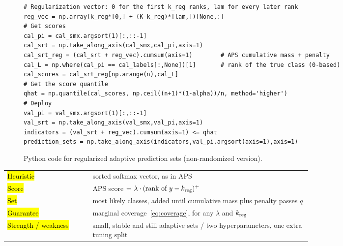 \documentclass[11pt]{article}
\theoremstyle{definition}
\newcommand{\qhat}{\hat{q}}
\newcommand{\kreg}{k_{\rm reg}}
\begin{document}
\begin{figure}[H]
\begin{snugshade}
\begin{Verbatim}
# Regularization vector: 0 for the first k_reg ranks, lam for every later rank
reg_vec = np.array(k_reg*[0,] + (K-k_reg)*[lam,])[None,:]
# Get scores
cal_pi = cal_smx.argsort(1)[:,::-1]
cal_srt = np.take_along_axis(cal_smx,cal_pi,axis=1)
cal_srt_reg = (cal_srt + reg_vec).cumsum(axis=1)        # APS cumulative mass + penalty
cal_L = np.where(cal_pi == cal_labels[:,None])[1]       # rank of the true class (0-based)
cal_scores = cal_srt_reg[np.arange(n),cal_L]
# Get the score quantile
qhat = np.quantile(cal_scores, np.ceil((n+1)*(1-alpha))/n, method='higher')
# Deploy
val_pi = val_smx.argsort(1)[:,::-1]
val_srt = np.take_along_axis(val_smx,val_pi,axis=1)
indicators = (val_srt + reg_vec).cumsum(axis=1) <= qhat
prediction_sets = np.take_along_axis(indicators,val_pi.argsort(axis=1),axis=1)
\end{Verbatim}
\end{snugshade}
\caption{Python code for regularized adaptive prediction sets (non-randomized version).}
\label{fig:code-raps}
\end{figure}

\begin{recipebox}
\begin{tabular}{@{}lp{0.72\linewidth}@{}}
\hl{Heuristic} & sorted softmax vector, as in APS\\
\hl{Score} & APS score $+\ \lambda\cdot(\text{rank of }y-\kreg)^+$\\
\hl{Set} & most likely classes, added until cumulative mass plus penalty passes $\qhat$\\
\hl{Guarantee} & marginal coverage~\eqref{eq:coverage}, for any $\lambda$ and $\kreg$\\
\hl{Strength / weakness} & small, stable and still adaptive sets / two hyperparameters, one extra tuning split
\end{tabular}
\end{recipebox}
\end{document}
